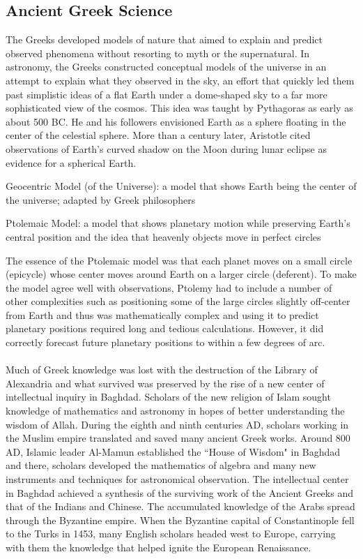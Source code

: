 \documentclass[12pt]{article}
\begin{document}
\subsection{Ancient Greek Science} 
The Greeks developed models of nature that aimed to explain and predict observed phenomena without resorting to myth or the supernatural. In astronomy, the Greeks constructed conceptual models of the universe in an attempt to explain what they observed in the sky, an effort that quickly led them past simplistic ideas of a flat Earth under a dome-shaped sky to a far more sophisticated view of the cosmos. This idea was taught by Pythagoras as early as about 500 BC. He and his followers envisioned Earth as a sphere floating in the center of the celestial sphere. More than a century later, Aristotle cited observations of Earth's curved shadow on the Moon during lunar eclipse as evidence for a spherical Earth. 
\begin{definition} Geocentric Model (of the Universe): a model that shows Earth being the center of the universe; adapted by Greek philosophers \end{definition} 
\begin{definition} Ptolemaic Model: a model that shows planetary motion while preserving Earth's central position and the idea that heavenly objects move in perfect circles \end{definition} 
The essence of the Ptolemaic model was that each planet moves on a small circle (epicycle) whose center moves around Earth on a larger circle (deferent). To make the model agree well with observations, Ptolemy had to include a number of other complexities such as positioning some of the large circles slightly off-center from Earth and thus was mathematically complex and using it to predict planetary positions required long and tedious calculations. However, it did correctly forecast future planetary positions to within a few degrees of arc. \\~\\ 
Much of Greek knowledge was lost with the destruction of the Library of Alexandria and what survived was preserved by the rise of a new center of intellectual inquiry in Baghdad. Scholars of the new religion of Islam sought knowledge of mathematics and astronomy in hopes of better understanding the wisdom of Allah. During the eighth and ninth centuries AD, scholars working in the Muslim empire translated and saved many ancient Greek works. Around 800 AD, Islamic leader Al-Mamun established the ``House of Wisdom" in Baghdad and there, scholars developed the mathematics of algebra and many new instruments and techniques for astronomical observation. The intellectual center in Baghdad achieved a synthesis of the surviving work of the Ancient Greeks and that of the Indians and Chinese. The accumulated knowledge of the Arabs spread through the Byzantine empire. When the Byzantine capital of Constantinople fell to the Turks in 1453, many English scholars headed west to Europe, carrying with them the knowledge that helped ignite the European Renaissance.
\end{document}
